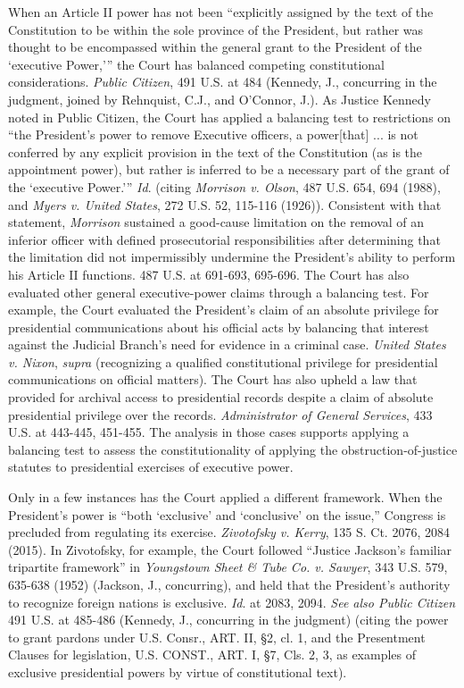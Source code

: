 When an Article II power has not been “explicitly assigned by the text of the Constitution to be within the sole province of the President, but rather was thought to be encompassed within the general grant to the President of the ‘executive Power,’” the Court has balanced competing constitutional considerations.
\textit{Public Citizen}, 491 U.S. at 484 (Kennedy, J., concurring in the judgment, joined by Rehnquist, C.J., and O’Connor, J.).
As Justice Kennedy noted in Public Citizen, the Court has applied a balancing test to restrictions on “the President’s power to remove Executive officers, a power[that] ... is not conferred by any explicit provision in the text of the Constitution (as is the appointment power), but rather is inferred to be a necessary part of the grant of the ‘executive Power.’”
\textit{Id}. (citing \textit{Morrison v. Olson}, 487 U.S. 654, 694 (1988), and \textit{Myers v. United States}, 272 U.S. 52, 115-116 (1926)).
Consistent with that statement, \textit{Morrison} sustained a good-cause limitation on the removal of an inferior officer with defined prosecutorial responsibilities after determining that the limitation did not impermissibly undermine the President’s ability to perform his Article II functions.
487 U.S. at 691-693, 695-696.
The Court has also evaluated other general executive-power claims through a balancing test.
For example, the Court evaluated the President’s claim of an absolute privilege for presidential communications about his official acts by balancing that interest against the Judicial Branch’s need for evidence in a criminal case.
\textit{United States v. Nixon}, \textit{supra} (recognizing a qualified constitutional privilege for presidential communications on official matters).
The Court has also upheld a law that provided for archival access to presidential records despite a claim of absolute presidential privilege over the records.
\textit{Administrator of General Services}, 433 U.S. at 443-445, 451-455.
The analysis in those cases supports applying a balancing test to assess the constitutionality of applying the obstruction-of-justice statutes to presidential exercises of executive power.

Only in a few instances has the Court applied a different framework.
When the President’s power is “both ‘exclusive’ and ‘conclusive’ on the issue,” Congress is precluded from regulating its exercise.
\textit{Zivotofsky v. Kerry}, 135 S. Ct. 2076, 2084 (2015).
In Zivotofsky, for example, the Court followed “Justice Jackson’s familiar tripartite framework” in \textit{Youngstown Sheet \& Tube Co. v. Sawyer}, 343 U.S. 579, 635-638 (1952) (Jackson, J., concurring), and held that the President’s authority to recognize foreign nations is exclusive.
\textit{Id}. at 2083, 2094.
\textit{See also Public Citizen} 491 U.S. at 485-486 (Kennedy, J., concurring in the judgment) (citing the power to grant pardons under U.S. Consr., ART. II, \S 2, cl. 1, and the Presentment Clauses for legislation, U.S. CONST., ART. I, \S 7, Cls. 2, 3, as examples of exclusive presidential powers by virtue of constitutional text).

